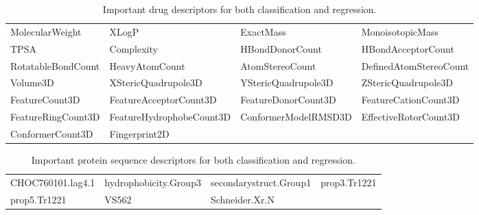 \begin{table*}
    \centering
    \begin{tabular}{llll}
    \toprule
    MolecularWeight & XLogP & ExactMass & MonoisotopicMass \\
    TPSA & Complexity & HBondDonorCount & HBondAcceptorCount \\
    RotatableBondCount & HeavyAtomCount & AtomStereoCount & DefinedAtomStereoCount \\
    Volume3D & XStericQuadrupole3D & YStericQuadrupole3D & ZStericQuadrupole3D \\ FeatureCount3D &  FeatureAcceptorCount3D & FeatureDonorCount3D & FeatureCationCount3D \\ FeatureRingCount3D & FeatureHydrophobeCount3D & ConformerModelRMSD3D & EffectiveRotorCount3D \\
    ConformerCount3D & Fingerprint2D \\
    \bottomrule
    \end{tabular}
    \caption{Important drug descriptors for both classification and regression.}
    \label{tbl:important_drug_descriptors}
\end{table*}

\begin{table*}
    \centering
    \begin{tabular}{llll}
    \toprule
    CHOC760101.lag4.1 & hydrophobicity.Group3 & secondarystruct.Group1 & prop3.Tr1221 \\
    prop5.Tr1221 & VS562 & Schneider.Xr.N \\
    \bottomrule
    \end{tabular}
    \caption{Important protein sequence descriptors for both classification and regression.}
    \label{tbl:important_protein_sequence_descriptors}
\end{table*}


